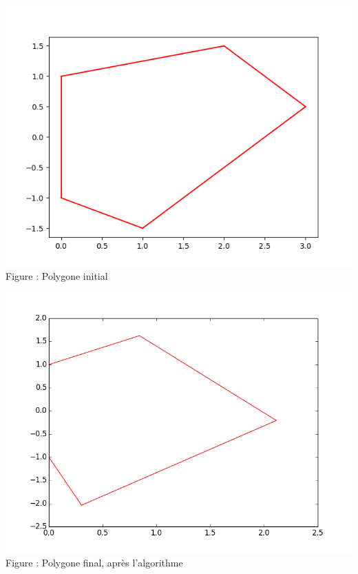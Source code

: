 \documentclass[a4paper,reqno]{article}
\begin{document}
\begin{center}
	\includegraphics[scale=0.5]{initialPolygon.png}
	\\ Figure : Polygone initial 
\end{center}

\begin{center}
	\includegraphics[scale=0.5]{finale.png}
	\\ Figure : Polygone final, après l'algorithme 
\end{center}
\end{document}
